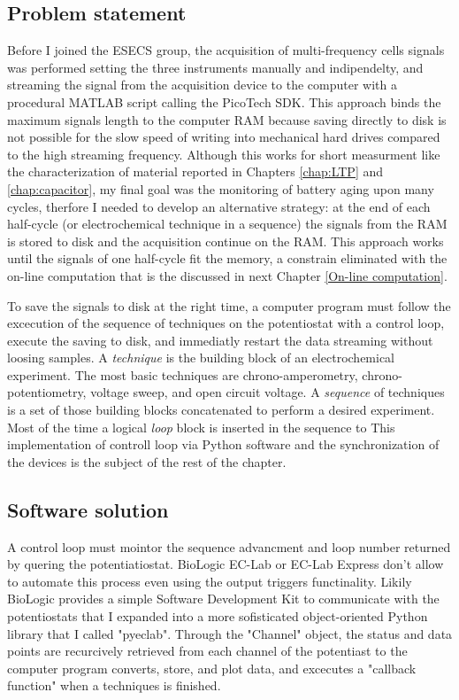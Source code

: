 \subsection{Problem statement}
Before I joined the ESECS group, the acquisition of multi-frequency cells signals was performed setting the three instruments manually and indipendelty, and streaming the signal from the acquisition device to the computer with a procedural MATLAB script calling the PicoTech SDK.
This approach binds the maximum signals length to the computer RAM because saving directly to disk is not possible for the slow speed of writing into mechanical hard drives compared to the high streaming frequency.
Although this works for short measurment like the characterization of material reported in Chapters \ref{chap:LTP} and \ref{chap:capacitor}, my final goal was the monitoring of battery aging upon many cycles, therfore I needed to develop an alternative strategy: at the end of each half-cycle (or electrochemical technique in a sequence) the signals from the RAM is stored to disk and the acquisition continue on the RAM.
This approach works until the signals of one half-cycle fit the memory, a constrain eliminated with the on-line computation that is the discussed in next Chapter \ref{On-line computation}.

To save the signals to disk at the right time, a computer program must follow the excecution of the sequence of techniques on the potentiostat with a control loop, execute the saving to disk, and immediatly restart the data streaming without loosing samples.
A \emph{technique} is the building block of an electrochemical experiment.
The most basic techniques are chrono-amperometry, chrono-potentiometry, voltage sweep, and open circuit voltage.
A \emph{sequence} of techniques is a set of those building blocks concatenated to perform a desired experiment.
Most of the time a logical \emph{loop} block is inserted in the sequence to 
This implementation of controll loop via Python software and the synchronization of the devices is the subject of the rest of the chapter.

\subsection{Software solution}
A control loop must mointor the sequence advancment and loop number returned by quering the potentiatiostat.
BioLogic EC-Lab or EC-Lab Express don't allow to automate this process even using the output triggers functinality.
Likily BioLogic provides a simple Software Development Kit to communicate with the potentiostats that I expanded into a more sofisticated object-oriented Python library that I called "pyeclab".
Through the "Channel" object, the status and data points are recurcively retrieved from each channel of the potentiast to the computer program converts, store, and plot data, and excecutes a "callback function" when a techniques is finished. 

